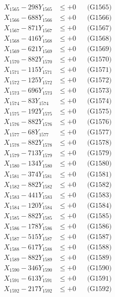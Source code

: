 \documentclass[a4paper,10pt]{article}
\begin{document}
{\begin{align}
X_{1565} - 298Y_{1565} &\leq +0 && \text{(G1565)} \\
X_{1566} - 688Y_{1566} &\leq +0 && \text{(G1566)} \\
X_{1567} - 871Y_{1567} &\leq +0 && \text{(G1567)} \\
X_{1568} - 416Y_{1568} &\leq +0 && \text{(G1568)} \\
X_{1569} - 621Y_{1569} &\leq +0 && \text{(G1569)} \\
X_{1570} - 882Y_{1570} &\leq +0 && \text{(G1570)} \\
\allowbreak
X_{1571} - 115Y_{1571} &\leq +0 && \text{(G1571)} \\
X_{1572} - 125Y_{1572} &\leq +0 && \text{(G1572)} \\
X_{1573} - 696Y_{1573} &\leq +0 && \text{(G1573)} \\
X_{1574} - 83Y_{1574} &\leq +0 && \text{(G1574)} \\
X_{1575} - 192Y_{1575} &\leq +0 && \text{(G1575)} \\
X_{1576} - 882Y_{1576} &\leq +0 && \text{(G1576)} \\
X_{1577} - 68Y_{1577} &\leq +0 && \text{(G1577)} \\
X_{1578} - 882Y_{1578} &\leq +0 && \text{(G1578)} \\
X_{1579} - 713Y_{1579} &\leq +0 && \text{(G1579)} \\
X_{1580} - 134Y_{1580} &\leq +0 && \text{(G1580)} \\
\allowbreak
X_{1581} - 374Y_{1581} &\leq +0 && \text{(G1581)} \\
X_{1582} - 882Y_{1582} &\leq +0 && \text{(G1582)} \\
X_{1583} - 441Y_{1583} &\leq +0 && \text{(G1583)} \\
X_{1584} - 120Y_{1584} &\leq +0 && \text{(G1584)} \\
X_{1585} - 882Y_{1585} &\leq +0 && \text{(G1585)} \\
X_{1586} - 178Y_{1586} &\leq +0 && \text{(G1586)} \\
X_{1587} - 515Y_{1587} &\leq +0 && \text{(G1587)} \\
X_{1588} - 617Y_{1588} &\leq +0 && \text{(G1588)} \\
X_{1589} - 882Y_{1589} &\leq +0 && \text{(G1589)} \\
X_{1590} - 346Y_{1590} &\leq +0 && \text{(G1590)} \\
\allowbreak
X_{1591} - 613Y_{1591} &\leq +0 && \text{(G1591)} \\
X_{1592} - 217Y_{1592} &\leq +0 && \text{(G1592)} \\

\end{align}}
\end{document}
